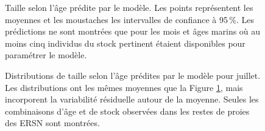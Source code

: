 \begin{figure}[htb]
    \centering
    \caption{Taille selon l'âge prédite par le modèle. Les points représentent les moyennes et les moustaches les intervalles de confiance à 95\,\%. Les prédictions ne sont montrées que pour les mois et âges marins où au moins cinq individus du stock pertinent étaient disponibles pour paramétrer le modèle.}
    \label{fig:pred-size-at-age}
\end{figure}

\begin{figure}[htb]
    \centering
    \caption{Distributions de taille selon l'âge prédites par le modèle pour juillet. Les distributions ont les mêmes moyennes que la Figure \ref{fig:pred-size-at-age}, mais incorporent la variabilité résiduelle autour de la moyenne. Seules les combinaisons d'âge et de stock observées dans les restes de proies des ERSN sont montrées.}
    \label{fig:hist-size-at-age}
\end{figure}

